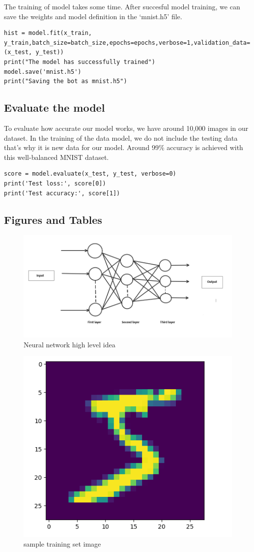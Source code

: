 \documentclass[conference]{IEEEtran}
\begin{document}
The training of model takes some time. After succesful model training, we can save the weights and model definition in the ‘mnist.h5’ file.
\begin{lstlisting}
hist = model.fit(x_train, y_train,batch_size=batch_size,epochs=epochs,verbose=1,validation_data=(x_test, y_test))
print("The model has successfully trained")
model.save('mnist.h5')
print("Saving the bot as mnist.h5")
\end{lstlisting}

\subsection{Evaluate the model}
To evaluate how accurate our model works, we have around 10,000 images in our dataset. In the training of the data model, we do not include the testing data that’s why it is new data for our model. Around 99\% accuracy is achieved with this well-balanced MNIST dataset.
\begin{lstlisting}
score = model.evaluate(x_test, y_test, verbose=0)
print('Test loss:', score[0])
print('Test accuracy:', score[1])
\end{lstlisting}

\subsection{Figures and Tables}
\begin{figure}[h]
    \centering
    \includegraphics[width=0.8
    \linewidth]{neural-network.png}
    \caption{Neural network high level idea}
    \label{fig:enter-label}
\end{figure}

\begin{figure}[h]
    \centering
    \includegraphics[width=0.5\linewidth]{Screenshot from 2025-02-03 14-53-39.png}
    \caption{sample training set image}
    \label{fig:enter-label}
\end{figure}
\end{document}
